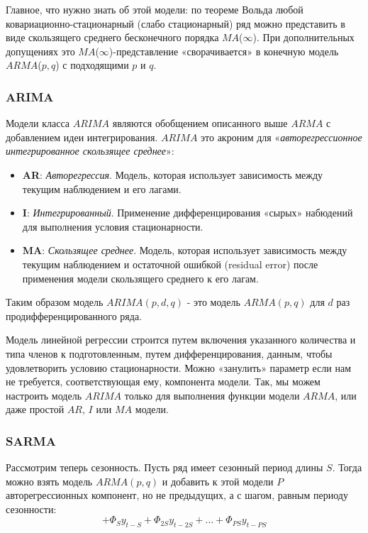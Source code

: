 Главное, что нужно знать об этой модели: по теореме Вольда любой ковариационно-стационарный (слабо стационарный) 
ряд можно представить в виде скользящего среднего бесконечного порядка $MA$($\infty$). При дополнительных допущениях 
это $MA$($\infty$)-представление «сворачивается» в
конечную модель $ARMA$(\(p,q\)) с подходящими \(p\) и \(q\).

\subsubsection{ARIMA}

Модели класса $ARIMA$ являются обобщением описанного выше $ARMA$ с добавлением идеи интегрирования. $ARIMA$ это 
акроним для «\textit{авторегрессионное интегрированное скользящее среднее}»\cite{Forecasting_Brownlee}:
\begin{itemize}
    \item \textbf{AR}: \textit{Авторегрессия}. Модель, которая использует зависимость между текущим наблюдением и его лагами. \\[-1em]
    \item \textbf{I}: \textit{Интегрированный}. Применение дифференцирования «сырых» набюдений для выполнения условия стационарности. \\[-1em]
    \item \textbf{MA}: \textit{Скользящее среднее}. Модель, которая использует зависимость между текущим наблюдением и остаточной ошибкой (residual error) после применения модели скользящего среднего к его лагам.
\end{itemize}

Таким образом модель $ARIMA(p, d, q)$ - это модель $ARMA(p, q)$ для $d$ раз продифференцированного ряда. 

Модель линейной регрессии строится путем включения указанного количества и типа членов к подготовленным, путем 
дифференцирования, данным, чтобы удовлетворить условию стационарности. Можно «занулить» параметр если нам не 
требуется, соответствующая ему, компонента модели. Так, мы можем настроить модель $ARIMA$ только для выполнения 
функции модели $ARMA$, или даже простой $AR$, $I$ или $MA$ модели. 

\subsubsection{SARMA}

Рассмотрим теперь сезонность. Пусть ряд имеет сезонный период длины $S$. Тогда можно взять модель 
$ARMA(p, q)$ и добавить к этой модели $P$ авторегрессионных компонент, но не предыдущих, а с шагом, равным периоду 
сезонности: 
\begin{equation*}
    + \Phi_S y_{t-S} + \Phi_{2S} y_{t-2S} + \dots + \Phi_{PS} y_{t-PS}
\end{equation*}

